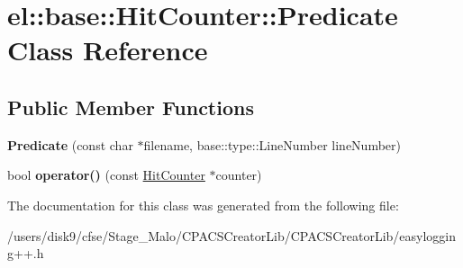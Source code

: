 \hypertarget{classel_1_1base_1_1HitCounter_1_1Predicate}{\section{el\-:\-:base\-:\-:Hit\-Counter\-:\-:Predicate Class Reference}
\label{classel_1_1base_1_1HitCounter_1_1Predicate}
}
\subsection*{Public Member Functions}
\begin{DoxyCompactItemize}
\item 
\hypertarget{classel_1_1base_1_1HitCounter_1_1Predicate_a466afee32aca2403bd2113151f930063}{{\bfseries Predicate} (const char $\ast$filename, base\-::type\-::\-Line\-Number line\-Number)}\label{classel_1_1base_1_1HitCounter_1_1Predicate_a466afee32aca2403bd2113151f930063}

\item 
\hypertarget{classel_1_1base_1_1HitCounter_1_1Predicate_ae07b1562a3c0ed38457401e60b80b0c5}{bool {\bfseries operator()} (const \hyperlink{classel_1_1base_1_1HitCounter}{Hit\-Counter} $\ast$counter)}\label{classel_1_1base_1_1HitCounter_1_1Predicate_ae07b1562a3c0ed38457401e60b80b0c5}

\end{DoxyCompactItemize}


The documentation for this class was generated from the following file\-:\begin{DoxyCompactItemize}
\item 
/users/disk9/cfse/\-Stage\-\_\-\-Malo/\-C\-P\-A\-C\-S\-Creator\-Lib/\-C\-P\-A\-C\-S\-Creator\-Lib/easylogging++.\-h\end{DoxyCompactItemize}
